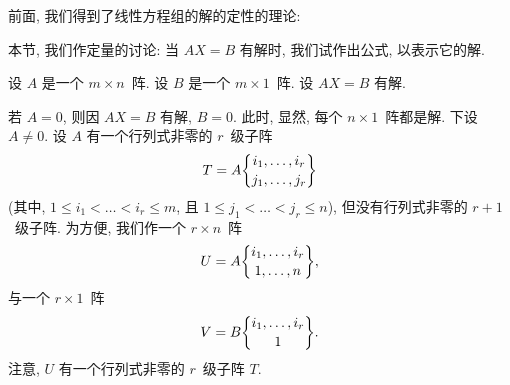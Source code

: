 \documentclass[../libro.tex]{subfiles}
\begin{document}
\maldevigalegajxo

前面, 我们得到了线性方程组的解的定性的理论:

\TheoremQualitativeTheoryOfLinearSystemOfEquations*

本节, 我们作定量的讨论:
当 \(AX = B\) 有解时,
我们试作出公式, 以表示它的解.

设 \(A\) 是一个 \(m \times n\)~阵.
设 \(B\) 是一个 \(m \times 1\)~阵.
设 \(AX = B\) 有解.

若 \(A = 0\),
则因 \(AX = B\) 有解,
\(B = 0\).
此时, 显然, 每个 \(n \times 1\)~阵都是解.
下设 \(A \neq 0\).
设 \(A\) 有一个行列式非零的 \(r\)~级子阵
\begin{align*}
    T = A\submat{i_1,\dots,i_r}{j_1,\dots,j_r}
\end{align*}
(其中, %
\(1 \leq i_1 < \dots < i_r \leq m\),
且 \(1 \leq j_1 < \dots < j_r \leq n\)), %
但没有行列式非零的 \(r+1\)~级子阵.
为方便, 我们作一个 \(r \times n\)~阵
\begin{align*}
    U = A\submat{i_1,\dots,i_r}{1,\dots,n},
\end{align*}
与一个 \(r \times 1\)~阵
\begin{align*}
    V = B\submat{i_1,\dots,i_r}{1}
    .
\end{align*}
注意, \(U\) 有一个行列式非零的 \(r\)~级子阵 \(T\).
\end{document}
